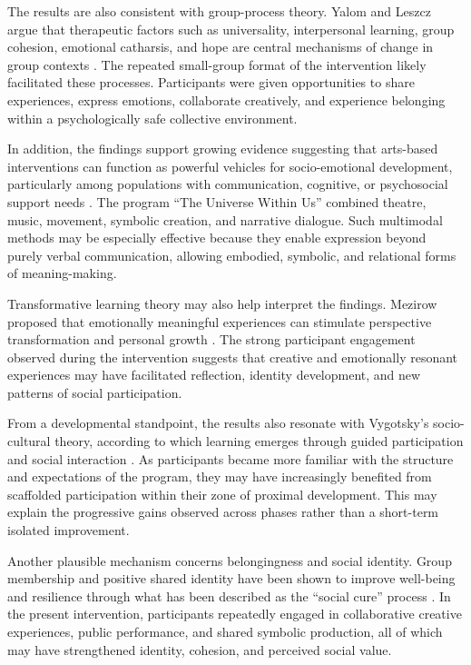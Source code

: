 \documentclass[journal]{IEEEtran}
\begin{document}
The results are also consistent with group-process theory. Yalom and Leszcz argue that therapeutic factors such as universality, interpersonal learning, group cohesion, emotional catharsis, and hope are central mechanisms of change in group contexts \cite{yalom2005}. The repeated small-group format of the intervention likely facilitated these processes. Participants were given opportunities to share experiences, express emotions, collaborate creatively, and experience belonging within a psychologically safe collective environment.

In addition, the findings support growing evidence suggesting that arts-based interventions can function as powerful vehicles for socio-emotional development, particularly among populations with communication, cognitive, or psychosocial support needs \cite{stickley2018,leavy2015}. The program ``The Universe Within Us'' combined theatre, music, movement, symbolic creation, and narrative dialogue. Such multimodal methods may be especially effective because they enable expression beyond purely verbal communication, allowing embodied, symbolic, and relational forms of meaning-making.

Transformative learning theory may also help interpret the findings. Mezirow proposed that emotionally meaningful experiences can stimulate perspective transformation and personal growth \cite{mezirow2000}. The strong participant engagement observed during the intervention suggests that creative and emotionally resonant experiences may have facilitated reflection, identity development, and new patterns of social participation.

From a developmental standpoint, the results also resonate with Vygotsky's socio-cultural theory, according to which learning emerges through guided participation and social interaction \cite{vygotsky1978}. As participants became more familiar with the structure and expectations of the program, they may have increasingly benefited from scaffolded participation within their zone of proximal development. This may explain the progressive gains observed across phases rather than a short-term isolated improvement.

Another plausible mechanism concerns belongingness and social identity. Group membership and positive shared identity have been shown to improve well-being and resilience through what has been described as the ``social cure'' process \cite{haslam2018}. In the present intervention, participants repeatedly engaged in collaborative creative experiences, public performance, and shared symbolic production, all of which may have strengthened identity, cohesion, and perceived social value.
\end{document}
